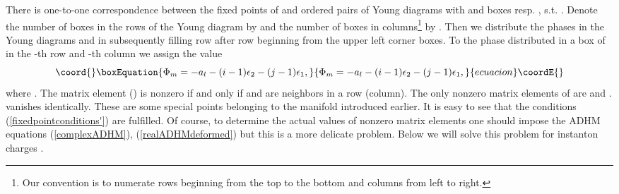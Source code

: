 \documentclass[a4paper,12pt]{article}
\begin{document}
There is one-to-one correspondence between the fixed points of
\coordHE{} and ordered pairs of Young diagrams \coordHE{} with
\coordHE{} and \coordHE{} boxes resp. , s.t. \coordHE{}. Denote the number
of boxes in the rows of the Young diagram \coordHE{} by \coordHE{} and the number of boxes in
columns\footnote{Our convention is to numerate rows beginning from
the top to the bottom and columns from left to right.} by
\coordHE{}. Then we
distribute the phases \coordHE{} in the
Young diagrams \coordHE{} and \coordHE{} in \coordHE{} subsequently filling row after row beginning
from the upper left corner boxes. To the phase \coordHE{}
distributed in a box of \coordHE{} in the \coordHE{}-th row and \coordHE{}-th column
we assign the value
\begin{equation}\coord{}\boxEquation{
\Phi_m=-a_l-(i-1)\epsilon_2-(j-1)\epsilon_1, \label{Phivalues}
}{
\Phi_m=-a_l-(i-1)\epsilon_2-(j-1)\epsilon_1, }{ecuacion}\coordE{}\end{equation}
where \coordHE{}. The matrix element \coordHE{} (\coordHE{}) is
nonzero if and only if \coordHE{} and \coordHE{} are neighbors in a
row (column). The only nonzero matrix elements of \coordHE{} are
\coordHE{} and \coordHE{}. \coordHE{} vanishes identically. These are
some special points belonging to the manifold \coordHE{}
introduced earlier. It is easy to see that the conditions
(\ref{fixedpointconditions'}) are fulfilled. Of course, to
determine the actual values of nonzero matrix elements one should
impose the ADHM equations (\ref{complexADHM}),
(\ref{realADHMdeformed}) but this is a more delicate problem.
Below we will solve this problem for instanton charges \coordHE{}.
\end{document}
